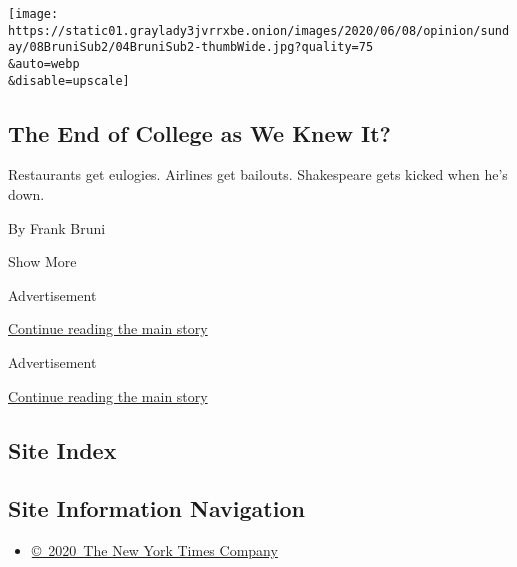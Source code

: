 \begin{enumerate}
  \texttt{[image: https://static01.graylady3jvrrxbe.onion/images/2020/06/08/opinion/sunday/08BruniSub2/04BruniSub2-thumbWide.jpg?quality=75\\\&auto=webp\\\&disable=upscale]}

  \hypertarget{the-end-of-college-as-we-knew-it}{%
  \subsection{The End of College as We Knew
  It?}\label{the-end-of-college-as-we-knew-it}}

  Restaurants get eulogies. Airlines get bailouts. Shakespeare gets
  kicked when he's down.

  By Frank Bruni
\end{enumerate}

Show More

Advertisement

\protect\hyperlink{after-mid1}{Continue reading the main story}

Advertisement

\protect\hyperlink{after-mktg}{Continue reading the main story}

\hypertarget{site-index}{%
\subsection{Site Index}\label{site-index}}

\hypertarget{site-information-navigation}{%
\subsection{Site Information
Navigation}\label{site-information-navigation}}

\begin{itemize}
\tightlist
\item
  \href{https://help.nytimes3xbfgragh.onion/hc/en-us/articles/115014792127-Copyright-notice}{©~2020~The
  New York Times Company}
\end{itemize}

